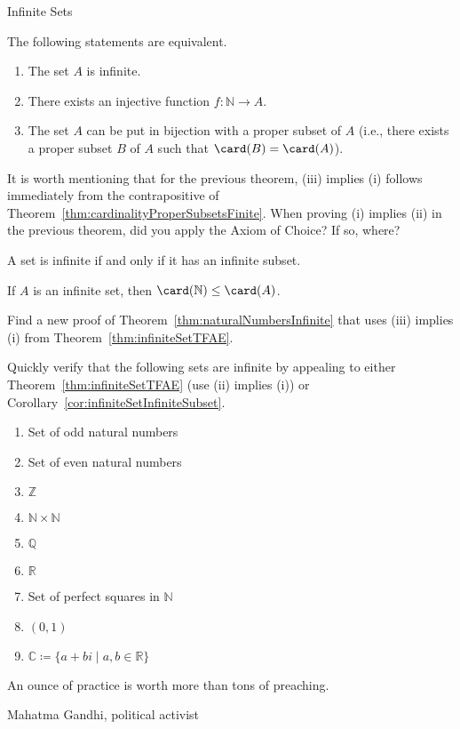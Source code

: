 \begin{section}{Infinite Sets}
\begin{theorem}\label{thm:infiniteSetTFAE}
The following statements are equivalent.
\begin{enumerate}[label=\textrm{(\roman*)}]
\item The set $A$ is infinite.
\item There exists an injective function $f:\mathbb{N}\to A$.
\item The set $A$ can be put in bijection with a proper subset of $A$ (i.e., there exists a proper subset $B$ of $A$ such that $\card(B)=\card(A)$).
\end{enumerate}
\end{theorem}

It is worth mentioning that for the previous theorem, (iii) implies (i) follows immediately from the contrapositive of Theorem~\ref{thm:cardinalityProperSubsetsFinite}. When proving (i) implies (ii) in the previous theorem, did you apply the Axiom of Choice?  If so, where? 

\begin{corollary}\label{cor:infiniteSetInfiniteSubset}
A set is infinite if and only if it has an infinite subset.
\end{corollary}

\begin{corollary}\label{cor:card(N) less than or equal to infinite set}
If $A$ is an infinite set, then $\card(\mathbb{N})\leq \card(A)$.
\end{corollary}

\begin{problem}
Find a new proof of Theorem~\ref{thm:naturalNumbersInfinite} that uses (iii) implies (i) from Theorem~\ref{thm:infiniteSetTFAE}.
\end{problem}

\begin{problem}\label{prob:moreInfiniteSets}
Quickly verify that the following sets are infinite by appealing to either Theorem~\ref{thm:infiniteSetTFAE} (use (ii) implies (i)) or Corollary~\ref{cor:infiniteSetInfiniteSubset}.
\begin{enumerate}[label=\textrm{(\alph*)}]
\item Set of odd natural numbers
\item Set of even natural numbers
\item $\mathbb{Z}$
\item $\mathbb{N}\times \mathbb{N}$
\item $\mathbb{Q}$
\item $\mathbb{R}$
\item Set of perfect squares in $\mathbb{N}$
\item $(0,1)$
\item $\mathbb{C}\coloneqq \{a+bi\mid a,b\in\mathbb{R}\}$
\end{enumerate}
\end{problem}

\epigraph{An ounce of practice is worth more than tons of preaching.}{Mahatma Gandhi, political activist}

\end{section}